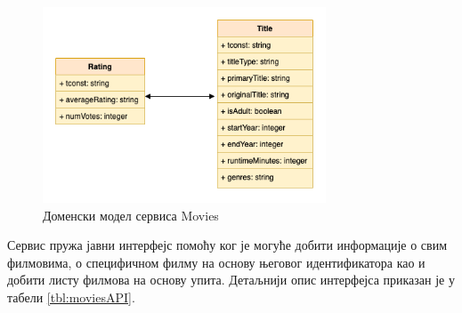\documentclass[12pt,oneside]{memoir}
\begin{document}
\begin{figure}[!ht]
  \centering
  \includegraphics[width=0.75\textwidth]{matfmaster/img/moviesShema.png}
  \caption{Доменски модел сервиса Movies}
  \label{fig:moviesShema}
\end{figure}
Сервис пружа јавни интерфејс помоћу ког је могуће добити информације о свим филмовима, о специфичном филму на основу његовог идентификатора као и добити листу филмова на основу упита. Детаљнији опис интерфејса приказан је у табели \ref{tbl:moviesAPI}.
\newpage
\end{document}

